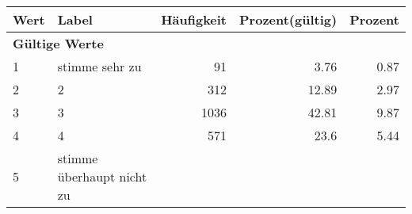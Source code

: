      \begin{longtable}{lXrrr}
     \toprule
     \textbf{Wert} & \textbf{Label} & \textbf{Häufigkeit} & \textbf{Prozent(gültig)} & \textbf{Prozent} \\
     \endhead
     \midrule
     \multicolumn{5}{l}{\textbf{Gültige Werte}}\\

     1 &
     \multicolumn{1}{X}{ stimme sehr zu   } &


       \num{91} &
       \num[round-mode=places,round-precision=2]{3.76} &
         \num[round-mode=places,round-precision=2]{0.87} \\

     2 &
     \multicolumn{1}{X}{ 2   } &


       \num{312} &
       \num[round-mode=places,round-precision=2]{12.89} &
         \num[round-mode=places,round-precision=2]{2.97} \\

     3 &
     \multicolumn{1}{X}{ 3   } &


       \num{1036} &
       \num[round-mode=places,round-precision=2]{42.81} &
         \num[round-mode=places,round-precision=2]{9.87} \\

     4 &
     \multicolumn{1}{X}{ 4   } &


       \num{571} &
       \num[round-mode=places,round-precision=2]{23.6} &
         \num[round-mode=places,round-precision=2]{5.44} \\

     5 &
     \multicolumn{1}{X}{ stimme überhaupt nicht zu   } &



\end{longtable}
